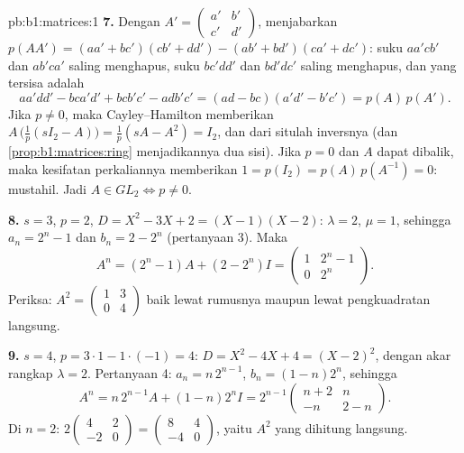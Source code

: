 \begin{solution}{pb:b1:matrices:1}
\textbf{7.} Dengan $A' = \begin{pmatrix} a' & b'\\ c' &
d'\end{pmatrix}$, menjabarkan $p(AA') = (aa' + bc')(cb' + dd') -
(ab' + bd')(ca' + dc')$: suku $aa'cb'$ dan $ab'ca'$ saling menghapus,
suku $bc'dd'$ dan $bd'dc'$ saling menghapus, dan yang tersisa adalah
\[
aa'dd' - bca'd' + bcb'c' - adb'c'
= (ad - bc)(a'd' - b'c') = p(A)\,p(A').
\]
Jika $p \neq 0$, maka Cayley--Hamilton memberikan $A\,\bigl(\tfrac1p(sI_2 -
A)\bigr) = \tfrac1p(sA - A^2) = I_2$, dan dari situlah inversnya (dan
\cref{prop:b1:matrices:ring} menjadikannya dua sisi). Jika $p = 0$ dan
$A$ dapat dibalik, maka kesifatan perkaliannya memberikan $1 = p(I_2) =
p(A)\,p(A^{-1}) = 0$: mustahil. Jadi $A \in GL_2 \iff p \neq 0$.

\textbf{8.} $s = 3$, $p = 2$, $D = X^2 - 3X + 2 = (X - 1)(X -
2)$: $\lambda = 2$, $\mu = 1$, sehingga $a_n = 2^n - 1$ dan $b_n = 2 -
2^n$ (pertanyaan 3). Maka
\[
A^n = (2^n - 1)A + (2 - 2^n)I
= \begin{pmatrix} 1 & 2^n - 1\\ 0 & 2^n \end{pmatrix}.
\]
Periksa: $A^2 = \begin{pmatrix} 1 & 3\\ 0 & 4\end{pmatrix}$ baik
lewat rumusnya maupun lewat pengkuadratan langsung.

\textbf{9.} $s = 4$, $p = 3\cdot1 - 1\cdot(-1) = 4$: $D = X^2 -
4X + 4 = (X - 2)^2$, dengan akar rangkap $\lambda = 2$. Pertanyaan 4: $a_n
= n\,2^{n-1}$, $b_n = (1 - n)2^n$, sehingga
\[
A^n = n\,2^{n-1}A + (1 - n)2^n I
= 2^{n-1}\begin{pmatrix} n + 2 & n\\ -n & 2 - n
\end{pmatrix}.
\]
Di $n = 2$: $2\begin{pmatrix} 4 & 2\\ -2 & 0\end{pmatrix} =
\begin{pmatrix} 8 & 4\\ -4 & 0 \end{pmatrix}$, yaitu $A^2$
yang dihitung langsung.


\end{solution}
